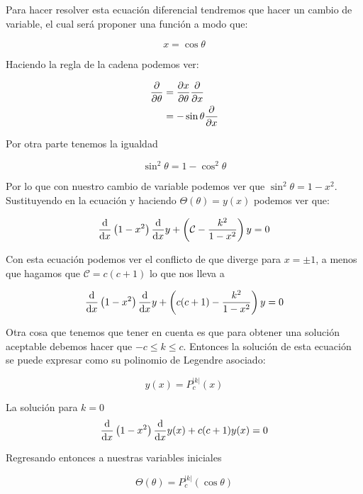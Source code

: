 \documentclass[11pt]{report}
\theoremstyle{plain}
\theoremstyle{definition}
\begin{document}
Para hacer resolver esta ecuación diferencial tendremos que hacer un cambio de variable, el cual será proponer una función a modo que:

\begin{equation*}
	x=\cos\theta
\end{equation*}

Haciendo la regla de la cadena podemos ver:

\begin{align*}
	\pdv{\theta} &= \pdv{x}{\theta}\pdv{x}\\
	&=-\sin\theta \pdv{x}
\end{align*}

Por otra parte tenemos la igualdad

\begin{equation*}
	\sin^2\theta = 1-\cos^2\theta
\end{equation*}

Por lo que con nuestro cambio de variable podemos ver que $\sin^2\theta = 1-x^2$. Sustituyendo en la ecuación y haciendo $\Theta(\theta) = y(x)$ podemos ver que:

\begin{equation*}
	\dv{x}\left(1-x^2\right)\dv{x}y+\left(\mathcal{C}-\frac{k^2}{1-x^2}\right)y=0
\end{equation*}

Con esta ecuación podemos ver el conflicto de que diverge para $x=\pm 1$, a menos que hagamos que $\mathcal{C} = c(c+1)$ lo que nos lleva a

\begin{equation*}
	\dv{x}\left(1-x^2\right)\dv{x}y+\left(c(c+1)-\frac{k^2}{1-x^2}\right)y=0
\end{equation*}

Otra cosa que tenemos que tener en cuenta es que para obtener una solución aceptable debemos hacer que $-c\leq k \leq c$. Entonces la solución de esta ecuación se puede expresar como su polinomio de Legendre asociado:

\begin{equation*}
	y(x)=P_c^{|k|}(x)
\end{equation*}

La solución para $k=0$
\begin{equation*}
	\dv{x}\left(1-x^2\right)\dv{x}y(x)+c(c+1)y(x)=0
\end{equation*}

Regresando entonces a nuestras variables iniciales

\begin{equation*}
	\Theta(\theta)=P_c^{|k|}(\cos\theta)
\end{equation*}
\end{document}
